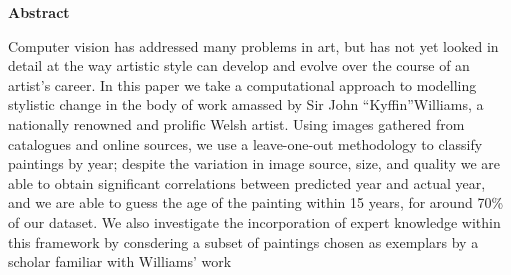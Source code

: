 \thispagestyle{empty}

\begin{center}
    {\LARGE\bf Abstract}
\end{center}

Computer vision has addressed many problems in art, but has not yet looked in detail at the way 
artistic style can develop and evolve over the course of an artist’s career. In this paper we 
take a computational approach to modelling stylistic change in the body of work amassed by Sir 
John ``Kyffin''Williams, a nationally renowned and prolific Welsh artist. Using images gathered 
from catalogues and online sources, we use a leave-one-out methodology to classify paintings by 
year; despite the variation in image source, size, and quality we are able to obtain significant 
correlations between predicted year and actual year, and we are able to guess the age of the 
painting within 15 years, for around 70\% of our dataset. We also investigate the incorporation of
expert knowledge within this framework by consdering a subset of paintings chosen as exemplars by 
a scholar familiar with Williams' work
